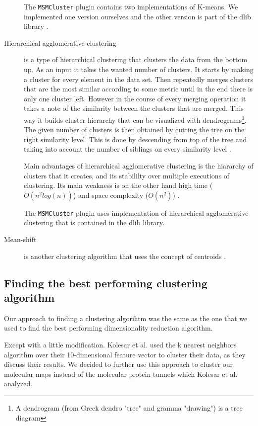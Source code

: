 \documentclass[journal]{vgtc}       %
\begin{document}
\begin{description}
The \verb|MSMCluster| plugin contains two implementations of K-means. We implemented one version ourselves and the other version is part of the dlib library \cite{dlib09}.
\item [Hierarchical agglomerative clustering] is a type of hierarchical clustering that clusters the data from the bottom up. As an input it takes the wanted number of clusters. It starts by making a cluster for every element in the data set. Then repeatedly merges clusters that are the most similar according to some metric until in the end there is only one cluster left. However in the course of every merging operation it takes a note of the similarity between the clusters that are merged. This way it builds cluster hierarchy that can be visualized with dendrograms\footnote{A dendrogram (from Greek dendro "tree" and gramma "drawing") is a tree diagram}. The given number of clusters is then obtained by cutting the tree on the right similarity level. This is done by descending from top of the tree and taking into account the number of siblings on every similarity level \cite{iir}.

Main advantages of hierarchical agglomerative clustering is the hiararchy of clusters that it creates, and its stabililty over multiple executions of clustering. Its main weakness is on the other hand high time ($O(n^2 log(n))$) and space complexity ($O(n^2)$) \cite{jain1999data}.

The \verb|MSMCluster| plugin uses implementation of hierarchical agglomerative clustering that is contained in the dlib library. 
\item [Mean-shift] is another clustering algorithm that uses the concept of centroids \cite{dlib09}. %
\end{description}

\subsection{Finding the best performing clustering algorithm}
Our approach to finding a clustering algorihtm was the same as the one that we used  to find the best performing dimensionality reduction algorithm.

Except with a little modification. Kolesar et al. \cite{kolesar} used the k nearest neighbors algorithm over their 10-dimensional feature vector to cluster their data, as they discuss their results. We decided to further use this approach to cluster our molecular maps instead of the molecular protein tunnels which Kolesar et al. analyzed.
\end{document}

